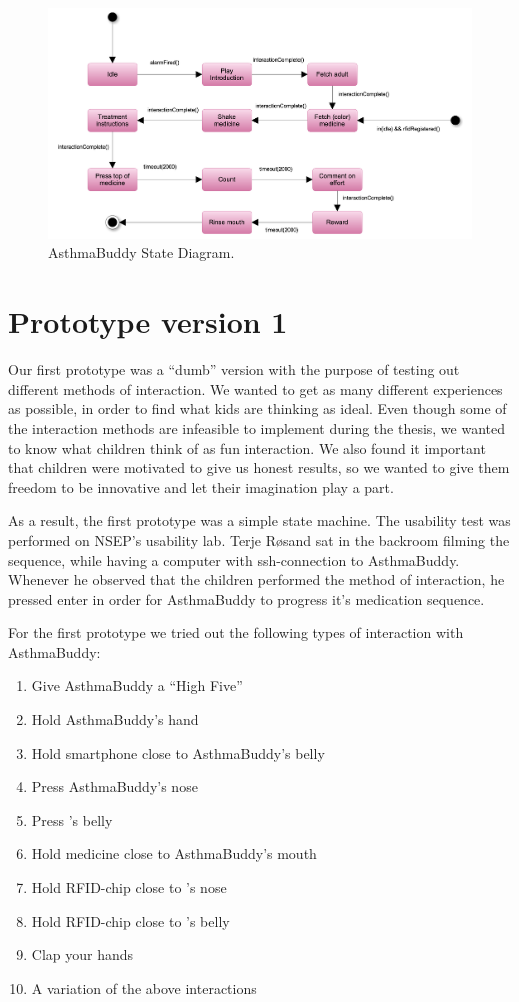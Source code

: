 \begin{figure}[H] 
	\centering
		\includegraphics[width=0.6\paperwidth]{Pictures/statediagram.png}
	\caption{AsthmaBuddy State Diagram.}
	\label{fig:asthmabuddy_statediagram}
\end{figure}
 
\section{Prototype version 1}
Our first prototype was a ``dumb'' version with the purpose of testing out different methods of interaction. We wanted to get as many different experiences as possible, in order to find what kids are thinking as ideal. Even though some of the interaction methods are infeasible to implement during the thesis, we wanted to know what children think of as fun interaction. We also found it important that children were motivated to give us honest results, so we wanted to give them freedom to be innovative and let their imagination play a part.  

As a result, the first prototype was a simple state machine. The usability test was performed on NSEP's usability lab. Terje R\o sand sat in the backroom filming the sequence, while having a computer with ssh-connection to AsthmaBuddy. Whenever he observed that the children performed the method of interaction, he pressed enter in order for AsthmaBuddy to progress it's medication sequence. 
 
For the first prototype we tried out the following types of interaction with AsthmaBuddy:
\begin{enumerate}
	\item{Give AsthmaBuddy a ``High Five''}
	\item{Hold AsthmaBuddy's hand}
	\item{Hold smartphone close to AsthmaBuddy's belly}
	\item{Press AsthmaBuddy's nose}
	\item{Press \buddy{}'s belly}
	\item{Hold medicine close to AsthmaBuddy's mouth}
	\item{Hold RFID-chip close to \buddy{}'s nose}
	\item{Hold RFID-chip close to \buddy{}'s belly}
	\item{Clap your hands}
	\item{A variation of the above interactions}
\end{enumerate}


